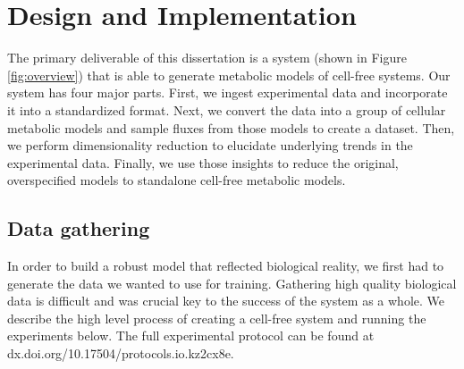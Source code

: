 \chapter{Design and Implementation} \label{chap:impl}

The primary deliverable of this dissertation is a system (shown in Figure \ref{fig:overview}) that is able to generate metabolic models of cell-free systems.
Our system has four major parts.
First, we ingest experimental data and incorporate it into a standardized format.
Next, we convert the data into a group of cellular metabolic models and sample fluxes from those models to create a dataset.
Then, we perform dimensionality reduction to elucidate underlying trends in the experimental data.
Finally, we use those insights to reduce the original, overspecified models to standalone cell-free metabolic models.

\section{Data gathering}
In order to build a robust model that reflected biological reality, we first had to generate the data we wanted to use for training.
Gathering high quality biological data is difficult and was crucial key to the success of the system as a whole.
We describe the high level process of creating a cell-free system and running the experiments below.
The full experimental protocol can be found at dx.doi.org/10.17504/protocols.io.kz2cx8e.


